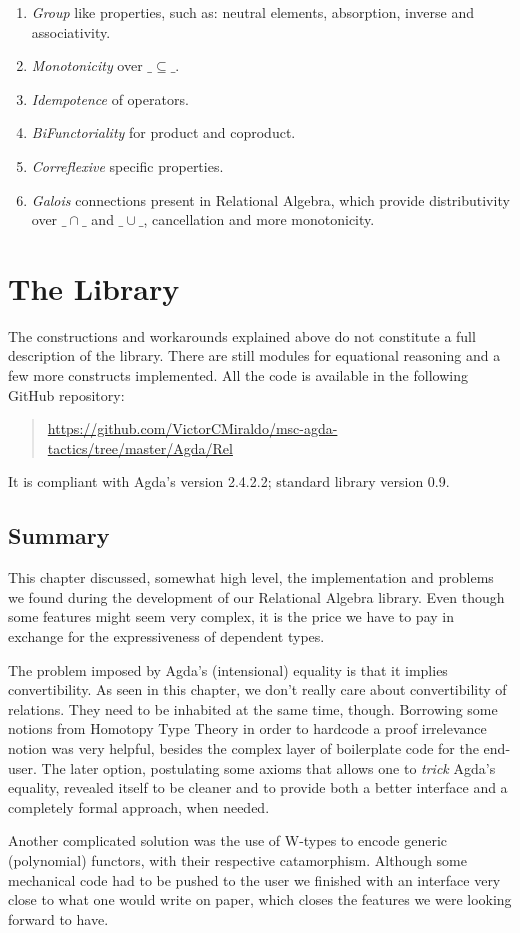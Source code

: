 \begin{enumerate}
  \item \emph{Group} like properties, such as: neutral elements, absorption, inverse and associativity.
  \item \emph{Monotonicity} over $\_\subseteq\_$.
  \item \emph{Idempotence} of operators.
  \item \emph{BiFunctoriality} for product and coproduct.
  \item \emph{Correflexive} specific properties.
  \item \emph{Galois} connections present in Relational Algebra, which provide
                distributivity over $\_\cap\_$ and $\_\cup\_$, cancellation and
                more monotonicity.
\end{enumerate}

\section{The Library}

The constructions and workarounds explained above do not constitute a full description of the library.
There are still modules for equational reasoning and a few more constructs implemented.
All the code is available in the following GitHub repository: 
\begin{quote}
\small \url{https://github.com/VictorCMiraldo/msc-agda-tactics/tree/master/Agda/Rel}
\end{quote}
It is compliant with Agda's version 2.4.2.2; standard library version 0.9.

\subsection{Summary}

This chapter discussed, somewhat high level, the implementation and problems
we found during the development of our Relational Algebra library. Even though some features
might seem very complex, it is the price we have to pay in exchange for the expressiveness 
of dependent types. 

The problem imposed by Agda's (intensional) equality is that it implies
convertibility. As seen in this chapter, we don't really care about convertibility of relations.
They need to be inhabited at the same time, though. 
Borrowing some notions from Homotopy Type Theory\cite{hottbook}
in order to hardcode a proof irrelevance notion was very helpful, besides the complex layer of boilerplate
code for the end-user. The later option, postulating some axioms that allows one to \emph{trick}
Agda's equality, revealed itself to be cleaner and to provide both a better interface
and a completely formal approach, when needed.

Another complicated solution was the use of W-types to encode generic (polynomial) functors,
with their respective catamorphism. Although some mechanical code had to be pushed to the user
we finished with an interface very close to what one would write on paper, which closes
the features we were looking forward to have.


